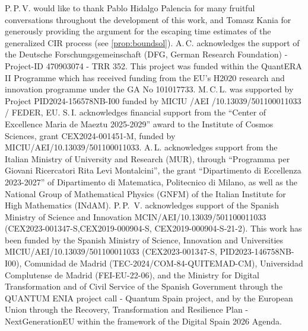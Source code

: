 \documentclass[11pt]{article}
\theoremstyle{break}
\numberwithin{equation}{section}
\begin{document}
P.\,P.\,V. would like to thank Pablo Hidalgo Palencia for many fruitful conversations throughout the development of this work, and Tomasz Kania for generously providing the argument for the escaping time estimates of the generalized CIR process (see \cref{prop:boundsol}). A.\,C. acknowledges the support of the Deutsche Forschungsgemeinschaft (DFG, German Research Foundation) - Project-ID 470903074 - TRR 352. This project was funded within the QuantERA II Programme which has received funding from the EU’s H2020 research and innovation programme under the GA No 101017733. M.\,C.\,L. was supported by  Project PID2024-156578NB-I00 funded by MICIU /AEI /10.13039/501100011033 / FEDER, EU. S.\,I. acknowledges financial support from the “Center of Excellence Maria de Maeztu 2025-2029” award to the Institute of Cosmos Sciences, grant CEX2024-001451-M, funded by MICIU/AEI/10.13039/501100011033. A.\,L. acknowledges support from the Italian Ministry of University and Research (MUR), through ``Programma per Giovani Ricercatori Rita Levi Montalcini'', the grant ``Dipartimento di Eccellenza 2023-2027'' of Dipartimento di Matematica, Politecnico di Milano, as well as the National Group of Mathematical Physics (GNFM) of the Italian Institute for High Mathematics (INdAM). P.\,P.\, V. acknowledges support of the Spanish Ministry of Science and Innovation MCIN/AEI/10.13039/501100011033 (CEX2023-001347-S,CEX2019-000904-S, CEX2019-000904-S-21-2). This work has been funded by the Spanish Ministry of Science, Innovation and Universities MICIU/AEI/10.13039/501100011033 (CEX2023-001347-S, PID2023-146758NB- I00), Comunidad de Madrid (TEC-2024/COM-84-QUITEMAD-CM), Universidad Complutense de Madrid (FEI-EU-22-06),  and the Ministry for Digital Transformation and of Civil Service of the Spanish Government through the QUANTUM ENIA project call - Quantum Spain project, and by the European Union through the Recovery, Transformation and Resilience Plan - NextGenerationEU within the framework of the Digital Spain 2026 Agenda. 

\printbibliography[heading=bibintoc]

\newpage 

\appendix 

\newpage

\newpage 

\newpage

\newpage

\newpage

\end{document}
